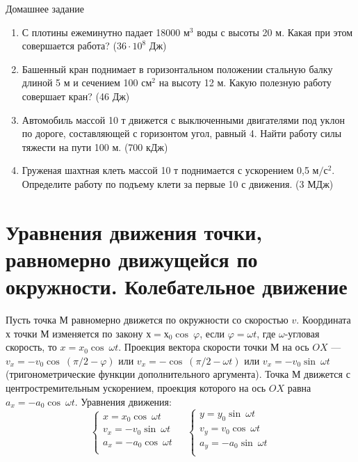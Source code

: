 \documentclass[a6paper, 11pt]{diss_4}
\renewcommand{\'}{\,'}
\begin{document}
\begin{center}
   Домашнее задание
\end{center}
\begin{enumerate}

\item С плотины ежеминутно падает 18000 $м^3$ воды с высоты 20 м. Какая при этом совершается работа?
($36\cdot10^8$ Дж)

\item Башенный кран поднимает в горизонтальном положении стальную балку длиной 5 м и сечением 100 $см^2$ на высоту 12 м. Какую полезную работу совершает кран? (46 Дж)

\item Автомобиль массой 10 т движется с выключенными двигателями под уклон по дороге, составляющей с горизонтом угол, равный 4\textdegree. Найти работу силы тяжести на пути 100 м. (700 кДж)

\item Груженая шахтная клеть массой 10 т поднимается с ускорением 0,5 $м/с^2$. Определите работу по подъему клети за первые 10 с движения. (3 МДж)

\end{enumerate}


\section{Уравнения движения точки, равномерно движущейся по окружности. Колебательное движение}

Пусть точка $М$ равномерно движется по окружности со скоростью $v$. Координата $х$ точки $М$ изменяется по закону
$х=х_0\cos\ \varphi$, если $\varphi=\omega t$, где $\omega$-угловая скорость, то $x = x_0\cos\ \omega t$. Проекция вектора скорости точки $М$ на ось $OX$ --- $v_x=-v_0\cos\ (\pi/2-\varphi)$ или $v_x=-\cos\ (\pi/2-\omega t)$ или
$v_x=-v_0\sin\ \omega t$ (тригонометрические функции дополнительного аргумента). Точка $М$ движется с центростремительным ускорением, проекция которого на ось $OX$ равна  $a_x=-a_0\cos\ \omega t$.  Уравнения движения:
\begin{equation*}
     \left\{
          \begin{array}{lr}
x=x_0\cos\ \omega t\\
v_x=-v_0\sin\ \omega t\\
a_x=-a_0\cos\ \omega t\\
          \end{array}
     \right.\ \ \ \ \
     \left\{
          \begin{array}{lr}
y=y_0\sin\ \omega t\\
v_y=v_0\cos\ \omega t\\
a_y=-a_0\sin\ \omega t\\
          \end{array}
     \right.
\end{equation*}
\end{document}
